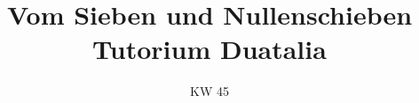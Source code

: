 \relax\relax

\iffull
\title[Zweites Tutorium -- Übungsblatt 2]{Vom Sieben und Nullenschieben\\\small Tutorium Duatalia}
\date{\sffamily KW 45}

\usetikzlibrary{decorations.text}
\fi

\makeatletter
\def\calc#1=#2;{\pgfmathsetmacro#1{int(#2)}\xdef#1{#1}}
\def\calcnext#1{\calc\sieve@step@sq = 2*#1;%
\calc\sieve@step@nxt = 3*#1;}
\def\MakeSieveEfficient{\def\calcnext##1{\calc\sieve@step@sq = ##1*##1;%
\calc\sieve@step@nxt = ##1*##1+##1;}}
\def\SieveStep#1#2{%
\calcnext{#2}%
\foreach\i in {\sieve@step@sq,\sieve@step@nxt,...,#1}{%
    \expandafter\xdef\csname sieve@\i @\endcsname{#2}%
}}

\def\SievePrintColor#1{%
    \ifcsname step\endcsname
    \ifnum#1=\step \colorlet{@col}{shadeB}\else \colorlet{@col}{@hlcolout}\fi
    \else \colorlet{@col}{@hlcolout}\fi
}

\def\SievePrintCell#1{
    \colorlet{@tx}{black}
    \ifcsname sieve@#1@\endcsname
        \SievePrintColor{\csuse{sieve@#1@}}%
    \else
        \ifcsname step\endcsname
            \ifnum\step=#1
                \colorlet{@col}{paletteB}
                \colorlet{@tx}{white}
            \else\colorlet{@col}{white}\fi
        \else \colorlet{@col}{white}\fi
    \fi
    \node[minimum size=1.6em,rounded corners=1pt,fill=@col,text=@tx] at (\curx, \cury) {#1};
    \calc\curx=\curx+1;
}
\def\SievePrintLine#1{\calc\cury=\cury-1;\calc\curx=0;}
\def\SievePrintStepSep#1{\ifnum#1<\maxstep\hfill\faAngleRight\hfill\fi}
\def\SievePrintWidth{4}
\def\SieveReset#1{\foreach\i in {1,...,#1}{\csgundef{sieve@\i @}}}
\def\SievePrintDo#1#2{\SievePrint{#1}}
\def\SievePrint#1{%
\tikzpicture[align-half-base,scale=.75]
\calc\curx=0; \calc\cury=0;
    \foreach\cell in {1,...,#1}{%
        \SievePrintCell{\cell}%
        \calc\check = mod(\cell, \SievePrintWidth);
        \ifnum\check=0
            \SievePrintLine{\line}
        \fi
    }%
\endtikzpicture
}%
\newcommand*\SieveFromTo[4][]{%
    \SieveReset{#2}\edef\maxstep{#4}%
    \foreach\step in {#3,...,\maxstep}{%
        \ifcsname sieve@\step @\endcsname\else
            \SieveStep{#2}{\step}%
            \SievePrintDo{#2}{\step}%
            \relax#1\relax
            \SievePrintStepSep{\step}%
        \fi
    }%
}
\newcommand\Sieve[2][]{\SieveFromTo[#1]{#2}{2}{#2}}
\def\SieveLast#1{\SieveLastTo{#1}{#1}}
\def\SieveLastTo#1#2{\begingroup
    \colorlet{@hlcolout}{lightgray!45!white}%
    \SieveReset{#1}\edef\maxstep{#2}%
    \foreach\step in {2,...,\maxstep}{%
        \ifcsname sieve@\step @\endcsname\else
            \SieveStep{#1}{\step}%
        \fi
    }%
    \let\step\maxstep\SievePrintDo{#1}{\maxstep}%
\endgroup}
\makeatother

